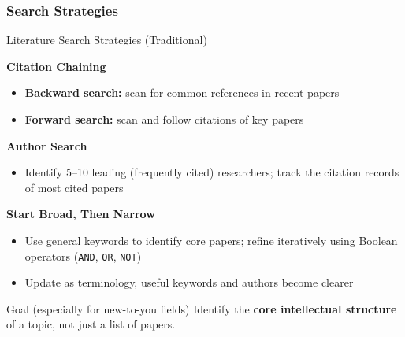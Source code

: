 \documentclass{beamer}
\begin{document}
\subsubsection{Search Strategies}
\begin{frame}{Literature Search Strategies (Traditional)}

  \footnotesize
  \textbf{Citation Chaining}
  \begin{itemize}
    \item \textbf{Backward search:} scan for common references in recent papers
    \item \textbf{Forward search:} scan and follow citations of key papers
  \end{itemize}

  \medskip
  \textbf{Author Search}
  \begin{itemize}
    \item Identify 5--10 leading (frequently cited) researchers;
    track the citation records of most cited papers
  \end{itemize}

  \medskip
  \textbf{Start Broad, Then Narrow}
  \begin{itemize}
    \item Use general keywords to identify core papers;
      refine iteratively using Boolean operators
      (\texttt{AND}, \texttt{OR}, \texttt{NOT})
    \item Update as terminology, useful keywords and authors become clearer
  \end{itemize}

  \medskip
  \begin{block}{Goal (especially for new-to-you fields)}
    Identify the \textbf{core intellectual structure} of a topic,
    not just a list of papers.
  \end{block}

\end{frame}


\end{document}
